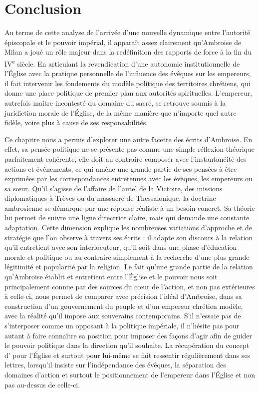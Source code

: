 \section*{Conclusion}

Au terme de cette analyse de l'arrivée d'une nouvelle dynamique entre l'autorité épiscopale et le pouvoir impérial, il apparaît assez clairement qu'Ambroise de Milan a joué un rôle majeur dans la redéfinition des rapports de force à la fin du IV\textsuperscript{e} siècle. En articulant la revendication d'une autonomie institutionnelle de l'Église avec la pratique personnelle de l'influence des évêques sur les empereurs, il fait intervenir les fondements du modèle politique des territoires chrétiens, qui donne une place politique de premier plan aux autorités spirituelles. L'empereur, autrefois maître incontesté du domaine du sacré, se retrouve soumis à la juridiction morale de l'Église, de la même manière que n'importe quel autre fidèle, voire plus à cause de ses responsabilités.

\bigskip

Ce chapitre nous a permis d'explorer une autre facette des écrits d'Ambroise. En effet, sa pensée politique ne se présente pas comme une simple réflexion théorique parfaitement cohérente, elle doit au contraire composer avec l'instantanéité des actions et événements, ce qui amène une grande partie de ses pensées à être exprimées par les correspondances entretenues avec les évêques, les empereurs ou sa sœur. Qu'il s'agisse de l'affaire de l'autel de la Victoire, des missions diplomatiques à Trèves ou du massacre de Thessalonique, la doctrine ambrosienne se démarque par une réponse réaliste à un besoin concret. Sa théorie lui permet de suivre une ligne directrice claire, mais qui demande une constante adaptation. Cette dimension explique les nombreuses variations d'approche et de stratégie que l'on observe à travers ses écrits : il adapte son discours à la relation qu'il entretient avec son interlocuteur, qu'il soit dans une phase d'éducation morale et politique ou au contraire simplement à la recherche d'une plus grande légitimité et popularité par la religion. Le fait qu'une grande partie de la relation qu'Ambroise établit et entretient entre l'Église et le pouvoir nous soit principalement connue par des sources du cœur de l'action, et non pas extérieures à celle-ci, nous permet de comparer avec précision l'idéal d'Ambroise, dans sa construction d'un gouvernement du peuple et d'un empereur chrétien modèle, avec la réalité qu'il impose aux souverains contemporains. S'il n'essaie pas de s'interposer comme un opposant à la politique impériale, il n'hésite pas pour autant à faire connaître sa position pour imposer des façons d'agir afin de guider le pouvoir politique dans la direction qu'il souhaite. La récupération du concept d' pour l'Église et surtout pour lui-même se fait ressentir régulièrement dans ses lettres, lorsqu'il insiste sur l'indépendance des évêques, la séparation des domaines d'action et surtout le positionnement de l'empereur dans l'Église et non pas au-dessus de celle-ci.

